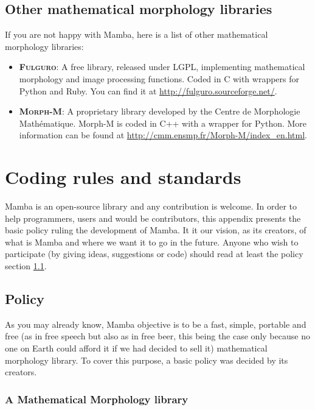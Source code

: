 \documentclass[a4paper,10pt,oneside]{article}
\begin{document}
\subsection{Other mathematical morphology libraries}

If you are not happy with Mamba, here is a list of other mathematical morphology
libraries:

\begin{itemize}
\item \textsc{\textbf{Fulguro}}: A free library, released under LGPL, implementing
mathematical morphology and image processing functions. Coded in C with wrappers
for Python and Ruby. You can find it at \url{http://fulguro.sourceforge.net/}.
\item \textsc{\textbf{Morph-M}}: A proprietary library developed by the Centre
de Morphologie Math\'{e}matique. Morph-M is coded in C++ with a wrapper for
Python. More information can be found at \url{http://cmm.ensmp.fr/Morph-M/index_en.html}.
\end{itemize}

\pagebreak

\section{Coding rules and standards}
\label{rules}

Mamba is an open-source library and any contribution is welcome. In
order to help programmers, users and would be contributors, this appendix
presents the basic policy ruling the development of Mamba. It it our
vision, as its creators, of what is Mamba and where we want it to go
in the future. Anyone who wish to participate (by giving ideas, suggestions
or code) should read at least the policy section \ref{cha:Policy}.

\subsection{Policy}
\label{cha:Policy}

As you may already know, Mamba objective is to be a fast, simple,
portable and free (as in free speech but also as in free beer, this
being the case only because no one on Earth could afford it if we
had decided to sell it) mathematical morphology library. To cover
this purpose, a basic policy was decided by its creators.


\subsubsection{A Mathematical Morphology library}
\end{document}
